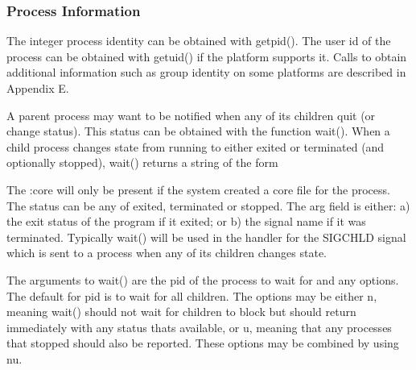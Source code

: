 
\subsubsection{Process Information}

The integer process identity can be obtained with
\textsf{getpid()}. The user id of the process can be
obtained with \textsf{getuid()} if the platform
supports it. Calls to obtain additional information such as group
identity on some platforms are described in Appendix E.

A parent process may want to be notified when any of its children quit
(or change status). This status can be obtained with the function
\textsf{wait()}. When a child process changes state from
{\textquotedbl}running{\textquotedbl} to either
{\textquotedbl}exited{\textquotedbl} or
{\textquotedbl}terminated{\textquotedbl} (and optionally
{\textquotedbl}stopped{\textquotedbl}), \textsf{wait()} returns a
string of the form


The \textsf{{\textquotedbl}:core{\textquotedbl}} will only be present if
the system created a core file for the process. The status can be any
of \textsf{{\textquotedbl}exited{\textquotedbl}},
\textsf{{\textquotedbl}terminated{\textquotedbl}} or
\textsf{{\textquotedbl}stopped{\textquotedbl}}. The \textsf{arg} field
is either: a) the exit status of the program if it exited; or b) the
signal name if it was terminated. Typically \textsf{wait()} will be
used in the handler for the \textsf{SIGCHLD} signal which is sent to a
process when any of its children changes state.

The arguments to \textsf{wait()} are the pid of the process to wait for
and any options. The default for pid is to wait for all children. The
options may be either \textsf{{\textquotedbl}n{\textquotedbl}}, meaning
\textsf{wait()} should not wait for children to block but should return
immediately with any status that{\textquotesingle}s available, or
\textsf{{\textquotedbl}u{\textquotedbl}}, meaning that any processes
that stopped should also be reported. These options may be combined by
using \textsf{{\textquotedbl}nu{\textquotedbl}}.

